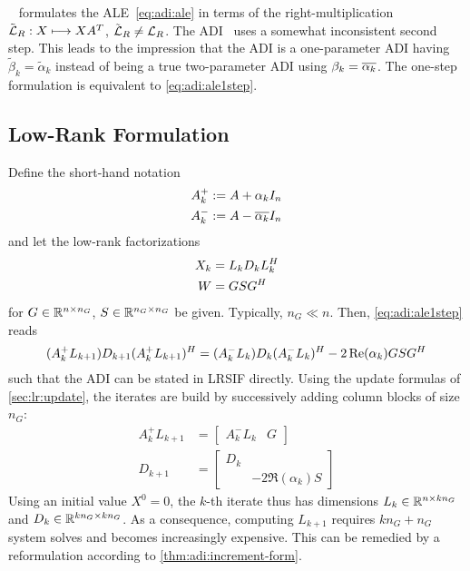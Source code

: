 \begin{remark}
  \citeauthor{Lang2017}~\cite{Lang2017} formulates the \ac{ALE}~\eqref{eq:adi:ale} in terms of the
  right-multiplication $\tilde {\operatorname{\mathcal L}}_R :X \longmapsto XA^T$, $\tilde {\operatorname{\mathcal L}}_R \neq \operatorname{\mathcal L}_R$.
  The ADI~\cite[Equation~(2.23)]{Lang2017} uses a somewhat inconsistent second step.
  This leads to the impression that the ADI is a one-parameter ADI having $\tilde\beta_k = \tilde\alpha_k$
  instead of being a true two-parameter ADI using $\beta_k = \conj{\alpha_k}$.
  The one-step formulation \cite[Equation~(2.24)]{Lang2017} is equivalent to \eqref{eq:adi:ale1step}.
\end{remark}

\subsection{Low-Rank Formulation}

Define the short-hand notation
\begin{equation}
\label{eq:adi:ale:shorthand}
\begin{aligned}
  A^+_k &:= A + \alpha_k I_n \\
  A^-_k &:= A - \conj{\alpha_k} I_n
\end{aligned}
\end{equation}
and let the low-rank factorizations
\begin{equation}
\begin{aligned}
  X_k &= L_k D_k L_k^H \\
  W &= GSG^H
\end{aligned}
\end{equation}
for $G\in\mathbb{R}^{n\times n_G}$, $S\in\mathbb{R}^{n_G\times n_G}$ be given.
Typically, $n_G \ll n$.
Then, \eqref{eq:adi:ale1step} reads
\begin{equation}
  (A_k^+ L_{k+1}) D_{k+1} (A_k^+ L_{k+1})^H
  = (A_k^- L_k) D_k (A_k^- L_k)^H - 2\operatorname{Re}(\alpha_k) GSG^H
\end{equation}
such that
the \ac{ADI} can be stated in \ac{LRSIF} directly.
Using the update formulas of \autoref{sec:lr:update},
the iterates are build by successively adding column blocks of size $n_G$:
\begin{equation}
\begin{aligned}
  A_k^+ L_{k+1} &= \begin{bmatrix}
    A^-_k L_k &
    G
  \end{bmatrix} \\
  D_{k+1} &= \begin{bmatrix}
    D_k \\
    & -2\Re(\alpha_k) S
  \end{bmatrix}
\end{aligned}
\end{equation}
Using an initial value $X^0=0$,
the $k$-th iterate thus has dimensions $L_k \in\mathbb{R}^{n\times kn_G}$ and $D_k \in\mathbb{R}^{kn_G\times kn_G}$.
As a consequence, computing $L_{k+1}$
requires $kn_G + n_G$ system solves and
becomes increasingly expensive.
This can be remedied by a reformulation according to \autoref{thm:adi:increment-form}.


